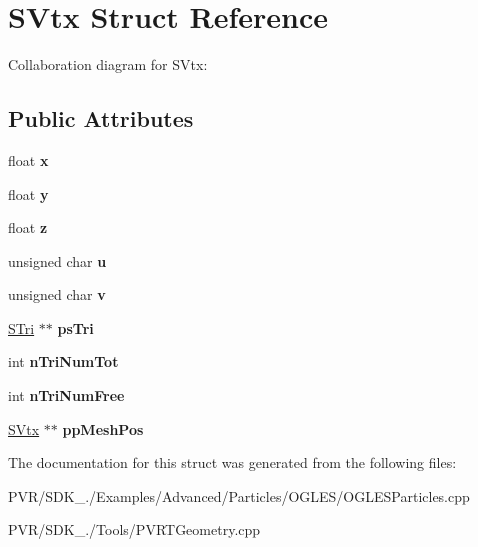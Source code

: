 \hypertarget{struct_s_vtx}{\section{S\+Vtx Struct Reference}
\label{struct_s_vtx}
}


Collaboration diagram for S\+Vtx\+:
\subsection*{Public Attributes}
\begin{DoxyCompactItemize}
\item 
\hypertarget{struct_s_vtx_adbe64aa754161acfe91f5f6d4f015db0}{float {\bfseries x}}\label{struct_s_vtx_adbe64aa754161acfe91f5f6d4f015db0}

\item 
\hypertarget{struct_s_vtx_a9088ee95de160bdb88870b64adebfa0b}{float {\bfseries y}}\label{struct_s_vtx_a9088ee95de160bdb88870b64adebfa0b}

\item 
\hypertarget{struct_s_vtx_aedcd318ecd488da73afbeaad910dccdd}{float {\bfseries z}}\label{struct_s_vtx_aedcd318ecd488da73afbeaad910dccdd}

\item 
\hypertarget{struct_s_vtx_a6282d123f854270730b9b8176cdf23e4}{unsigned char {\bfseries u}}\label{struct_s_vtx_a6282d123f854270730b9b8176cdf23e4}

\item 
\hypertarget{struct_s_vtx_ac166fa6ab087e87764a4b48f97602954}{unsigned char {\bfseries v}}\label{struct_s_vtx_ac166fa6ab087e87764a4b48f97602954}

\item 
\hypertarget{struct_s_vtx_a690db2742797df62af7ddb1bc1de049a}{\hyperlink{struct_s_tri}{S\+Tri} $\ast$$\ast$ {\bfseries ps\+Tri}}\label{struct_s_vtx_a690db2742797df62af7ddb1bc1de049a}

\item 
\hypertarget{struct_s_vtx_a17943be24b71908b6855fe011b50a524}{int {\bfseries n\+Tri\+Num\+Tot}}\label{struct_s_vtx_a17943be24b71908b6855fe011b50a524}

\item 
\hypertarget{struct_s_vtx_a3f573d42c4ed46118abc568aa493e798}{int {\bfseries n\+Tri\+Num\+Free}}\label{struct_s_vtx_a3f573d42c4ed46118abc568aa493e798}

\item 
\hypertarget{struct_s_vtx_a882fb1bceba251c67f231e16126e5b27}{\hyperlink{struct_s_vtx}{S\+Vtx} $\ast$$\ast$ {\bfseries pp\+Mesh\+Pos}}\label{struct_s_vtx_a882fb1bceba251c67f231e16126e5b27}

\end{DoxyCompactItemize}


The documentation for this struct was generated from the following files\+:\begin{DoxyCompactItemize}
\item 
P\+V\+R/\+S\+D\+K\+\_./\+Examples/\+Advanced/\+Particles/\+O\+G\+L\+E\+S/O\+G\+L\+E\+S\+Particles.\+cpp\item 
P\+V\+R/\+S\+D\+K\+\_./\+Tools/P\+V\+R\+T\+Geometry.\+cpp\end{DoxyCompactItemize}
